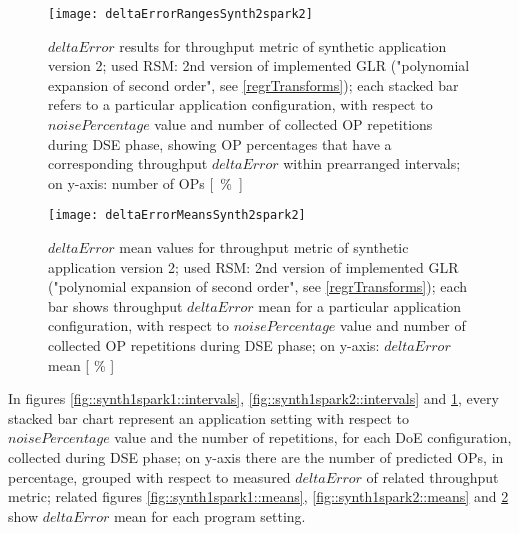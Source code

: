 \begin{figure}[h]

    \centering
    
    \texttt{[image: deltaErrorRangesSynth2spark2]}
    
     \caption[$deltaError$ results for throughput metric of synthetic application version 2; used RSM: 2nd version of implemented GLR ("polynomial expansion of second order")]{$deltaError$ results for throughput metric of synthetic application version 2; used RSM: 2nd version of implemented GLR ("polynomial expansion of second order", see \ref{regrTransforms}); each stacked bar refers to a particular application configuration, with respect to $noisePercentage$ value and number of collected OP repetitions during DSE phase, showing OP percentages that have a corresponding throughput $deltaError$ within prearranged intervals; on y-axis: number of OPs \hbox{[ \% ]}}
    
    \label{fig::synth2spark2::intervals}
    
\end{figure}

\begin{figure}[h]

    \centering
    
    \texttt{[image: deltaErrorMeansSynth2spark2]}
    
    \caption[$deltaError$ mean values for throughput metric of synthetic application version 2; used RSM: 2nd version of implemented GLR ("polynomial expansion of second order")]{$deltaError$ mean values for throughput metric of synthetic application version 2; used RSM: 2nd version of implemented GLR ("polynomial expansion of second order", see \ref{regrTransforms}); each bar shows throughput $deltaError$ mean for a particular application configuration, with respect to $noisePercentage$ value and number of collected OP repetitions during DSE phase; on y-axis: $deltaError$ mean [ \% ]}
    
    \label{fig::synth2spark2::means}
    
\end{figure}





In figures \ref{fig::synth1spark1::intervals}, \ref{fig::synth1spark2::intervals} and \ref{fig::synth2spark2::intervals}, every stacked bar chart represent an application setting with respect to $noisePercentage$ value and the number of repetitions, for each DoE configuration, collected during DSE phase; on y-axis there are the number of predicted OPs, in percentage, grouped with respect to measured $deltaError$ of related throughput metric; related figures \ref{fig::synth1spark1::means}, \ref{fig::synth1spark2::means} and \ref{fig::synth2spark2::means} show $deltaError$ mean for each program setting.

